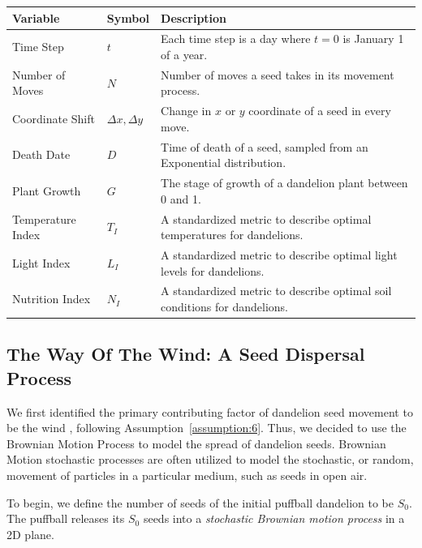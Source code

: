 \begin{table}[h]
\renewcommand{\arraystretch}{1.3}
    \begin{tabularx}{\textwidth}{p{} lX}
    \toprule
    \textbf{Variable}           & \textbf{Symbol} & \textbf{Description}  \\ \midrule
    \raggedright Time Step & $t$  & Each time step is a day where \(t = 0\) is January 1 of a year. \\
    \rowcolor{gray!15}
    \raggedright Number of Moves & $N$  & Number of moves a seed takes in its movement process. \\
    Coordinate Shift & $\Delta x, \Delta y$    &  Change in \(x\) or \(y\) coordinate of a seed in every move.  \\
    \rowcolor{gray!15} \raggedright  Death Date & $D$               &  Time of death of a seed, sampled from an Exponential distribution.  \\
    \raggedright Plant Growth & $G$ & The stage of growth of a dandelion plant between 0 and 1. \\
    \rowcolor{gray!15} \raggedright Temperature Index & $T_I$ & A standardized metric to describe optimal temperatures for dandelions. \\
    \raggedright Light Index & $L_I$ & A standardized metric to describe optimal light levels for dandelions. \\
    \rowcolor{gray!15} \raggedright Nutrition Index & $N_I$ & A standardized metric to describe optimal soil conditions for dandelions. \\
    \bottomrule
    \end{tabularx}
\end{table}

\subsection{The Way Of The Wind: A Seed Dispersal Process}

We first identified the primary contributing factor of dandelion seed movement to be the wind \cite{wang_separating_2021}, following Assumption~\ref{assumption:6}. Thus, we decided to use the Brownian Motion Process to model the spread of dandelion seeds. Brownian Motion stochastic processes are often utilized to model the stochastic, or random, movement of particles in a particular medium, such as seeds in open air.

To begin, we define the number of seeds of the initial puffball dandelion to be \(S_0\). The puffball releases its \(S_0\) seeds into a \textit{stochastic Brownian motion process} in a 2D plane. 

